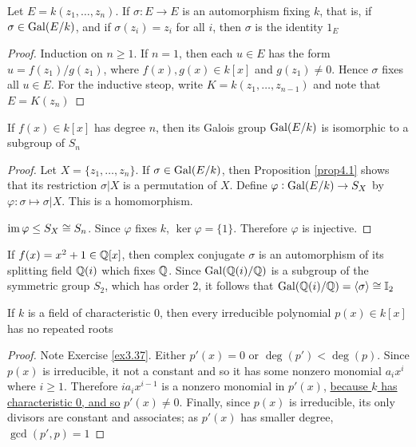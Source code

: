 \documentclass[11pt]{article}
\begin{document}
\begin{lemma}[]
Let \(E=k(z_1,\dots,z_n)\). If \(\sigma:E\to E\) is an automorphism fixing \(k\),
that is, if \(\sigma\in\operatorname{Gal}(E/k)\), and if \(\sigma(z_i)=z_i\) for all \(i\), then
\(\sigma\) is the identity \(1_E\)
\end{lemma}

\begin{proof}
Induction on \(n\ge1\). If \(n=1\), then each \(u\in E\) has the form 
\(u=f(z_1)/g(z_1)\), where \(f(x),g(x)\in k[x]\) and \(g(z_1)\neq0\). Hence
\(\sigma\) fixes all \(u\in E\). For the inductive steop, write
\(K=k(z_1,\dots,z_{n-1})\) and note that \(E=K(z_n)\)
\end{proof}

\begin{theorem}[]
If \(f(x)\in k[x]\) has degree \(n\), then its Galois group \(\operatorname{Gal}(E/k)\) is
isomorphic to a subgroup of \(S_n\)
\end{theorem}

\begin{proof}
Let \(X=\{z_1,\dots,z_n\}\). If \(\sigma\in\operatorname{Gal}(E/k)\), then Proposition
\ref{prop4.1} shows that its restriction \(\sigma|X\) is a permutation of \(X\).
Define \(\varphi:\operatorname{Gal}(E/k)\to S_X\) by \(\varphi:\sigma\mapsto\sigma|X\). This is a
homomorphism.

\(\operatorname{im}\varphi\le S_X\cong S_n\). Since \(\varphi\) fixes \(k\), \(\ker\varphi=\{1\}\).
Therefore \(\varphi\) is injective.
\end{proof}

If \(f(x)=x^2+1\in\mathbb{Q}[x]\), then complex conjugate \(\sigma\) is an automorphism of its
splitting field \(\mathbb{Q}(i)\) which fixes \(\mathbb{Q}\). Since \(\operatorname{Gal}(\mathbb{Q}(i)/\mathbb{Q})\) is a
subgroup of the symmetric group \(S_2\), which has order 2, it follows that 
\(\operatorname{Gal}(\mathbb{Q}(i)/\mathbb{Q})=\langle\sigma\rangle\cong\mathbb{I}_2\)

\begin{lemma}[]
\label{lemma4.4}
If \(k\) is a field of characteristic 0, then every irreducible polynomial 
\(p(x)\in k[x]\) has no repeated roots
\end{lemma}

\begin{proof}
Note Exercise \ref{ex3.37}. Either \(p'(x)=0\) or \(\deg(p')<\deg(p)\).
Since \(p(x)\) is irreducible, it not a constant and so it has some nonzero
monomial \(a_ix^i\) where \(i\ge1\). Therefore \(ia_ix^{i-1}\) is a nonzero
monomial in \(p'(x)\), \uline{because \(k\) has characteristic 0, and so} 
\uline{\(p'(x)\neq 0\)}. Finally, since \(p(x)\) is irreducible, its only divisors
are constant and associates; as \(p'(x)\) has smaller degree, \(\gcd(p',p)=1\)
\end{proof}
\end{document}
